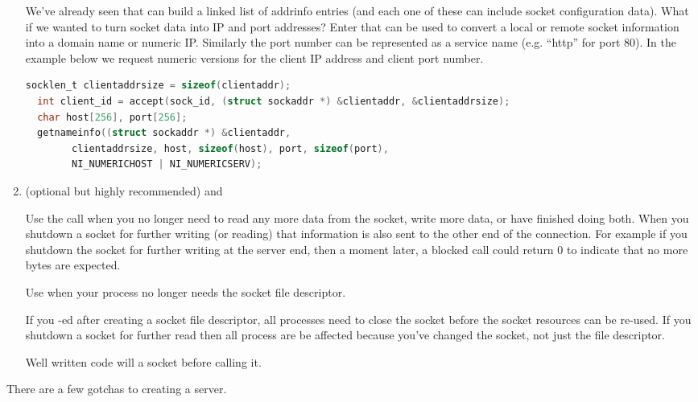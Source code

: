 \begin{enumerate}
  We've already seen  that can build a linked list of addrinfo entries (and each one of these can include socket configuration data).
  What if we wanted to turn socket data into IP and port addresses? Enter  that can be used to convert a local or remote socket information into a domain name or numeric IP.
  Similarly the port number can be represented as a service name (e.g.
  ``http'' for port 80).
  In the example below we request numeric versions for the client IP address and client port number.

  \begin{lstlisting}[language=C]
  socklen_t clientaddrsize = sizeof(clientaddr);
  int client_id = accept(sock_id, (struct sockaddr *) &clientaddr, &clientaddrsize);
  char host[256], port[256];
  getnameinfo((struct sockaddr *) &clientaddr,
        clientaddrsize, host, sizeof(host), port, sizeof(port),
        NI_NUMERICHOST | NI_NUMERICSERV);
  \end{lstlisting}


  \item (optional but highly recommended)  and 

  Use the  call when you no longer need to read any more data from the socket, write more data, or have finished doing both.
  When you shutdown a socket for further writing (or reading) that information is also sent to the other end of the connection.
  For example if you shutdown the socket for further writing at the server end, then a moment later, a blocked  call could return 0 to indicate that no more bytes are expected.

  Use  when your process no longer needs the socket file descriptor.

  If you -ed after creating a socket file descriptor, all processes need to close the socket before the socket resources can be re-used.
  If you shutdown a socket for further read then all process are be affected because you've changed the socket, not just the file descriptor.

  Well written code will  a socket before calling  it.


\end{enumerate}

There are a few gotchas to creating a server.

